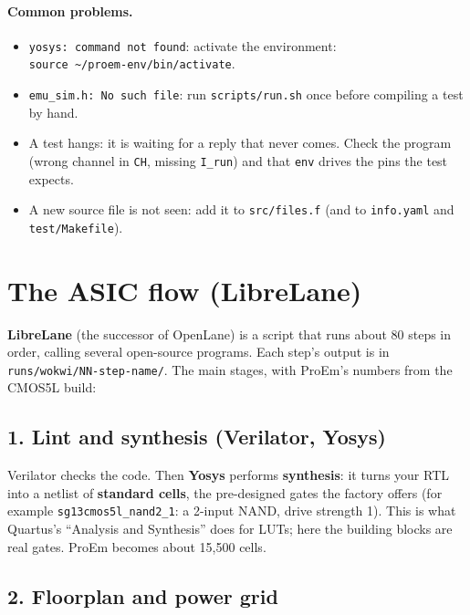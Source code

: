 \documentclass[11pt,a4paper]{article}
\newcommand{\file}[1]{\texttt{#1}}
\begin{document}
\paragraph{Common problems.}
\begin{itemize}
\item \texttt{yosys: command not found}: activate the environment:\\ \texttt{source \textasciitilde/proem-env/bin/activate}.
\item \texttt{emu\_sim.h: No such file}: run \file{scripts/run.sh} once before compiling a test by hand.
\item A test hangs: it is waiting for a reply that never comes. Check the program (wrong channel in \texttt{CH}, missing \texttt{I\_run}) and that \texttt{env} drives the pins the test expects.
\item A new source file is not seen: add it to \file{src/files.f} (and to \file{info.yaml} and \file{test/Makefile}).
\end{itemize}

\section{The ASIC flow (LibreLane)}

\textbf{LibreLane} (the successor of OpenLane) is a script that runs about 80 steps in order, calling several open-source programs. Each step's output is in \file{runs/wokwi/NN-step-name/}. The main stages, with ProEm's numbers from the CMOS5L build:

\subsection{1. Lint and synthesis (Verilator, Yosys)}

Verilator checks the code. Then \textbf{Yosys} performs \textbf{synthesis}: it turns your RTL into a netlist of \textbf{standard cells}, the pre-designed gates the factory offers (for example \texttt{sg13cmos5l\_nand2\_1}: a 2-input NAND, drive strength 1). This is what Quartus's ``Analysis and Synthesis'' does for LUTs; here the building blocks are real gates. ProEm becomes about 15,500 cells.

\subsection{2. Floorplan and power grid}
\end{document}
